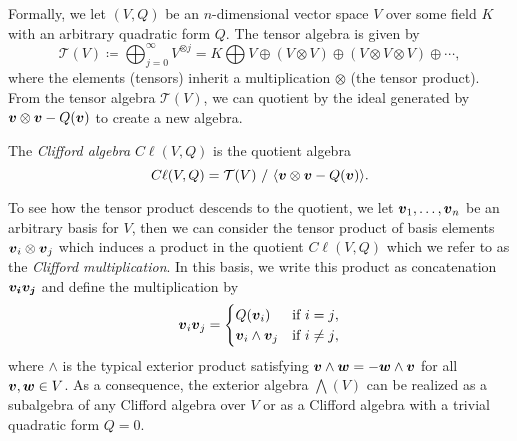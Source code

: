 Formally, we let $(V,Q)$ be an $n$-dimensional vector space $V$ over some field $K$ with an arbitrary quadratic form $Q$.  The tensor algebra is given by
\begin{equation}
\mathcal{T}(V) \coloneqq \bigoplus_{j=0}^\infty V^{\otimes j} = K \bigoplus V \oplus (V\otimes V) \oplus (V\otimes V \otimes V) \oplus \cdots,
\end{equation}
where the elements (tensors) inherit a multiplication $\otimes$ (the tensor product). From the tensor algebra $\mathcal{T}(V)$, we can quotient by the ideal generated by $\boldsymbol{v}\otimes \boldsymbol{v} - Q(\boldsymbol{v})$ to create a new algebra.
\begin{definition}
The \emph{Clifford algebra} $C\ell(V,Q)$ is the quotient algebra
\begin{equation}
C\ell(V,Q) = \mathcal{T}(V) ~ / ~ \langle \boldsymbol{v} \otimes \boldsymbol{v} - Q(\boldsymbol{v}) \rangle.
\end{equation}
\end{definition}
To see how the tensor product descends to the quotient, we let $\boldsymbol{v}_1, \dots, \boldsymbol{v}_n$ be an arbitrary basis for $V$, then we can consider the tensor product of basis elements $\boldsymbol{v}_i \otimes \boldsymbol{v}_j$ which induces a product in the quotient $C\ell(V,Q)$ which we refer to as the \emph{Clifford multiplication}. In this basis, we write this product as concatenation $\boldsymbol{v_i}\boldsymbol{v_j}$ and define the multiplication by
\begin{equation}
\label{eq:clifford_multiplication}
\boldsymbol{v}_i \boldsymbol{v}_j = \begin{cases} Q(\boldsymbol{v}_i) & \textrm{if $i=j$}, \\ \boldsymbol{v}_i \wedge \boldsymbol{v}_j & \textrm{if $i\neq j$},\end{cases}
\end{equation}
where $\wedge$ is the typical exterior product satisfying $\boldsymbol{v}\wedge \boldsymbol{w} = - \boldsymbol{w}\wedge \boldsymbol{v}$ for all $\boldsymbol{v},\boldsymbol{w}\in V$.  As a consequence, the exterior algebra $\bigwedge(V)$ can be realized as a subalgebra of any Clifford algebra over $V$ or as a Clifford algebra with a trivial quadratic form $Q=0$.  

